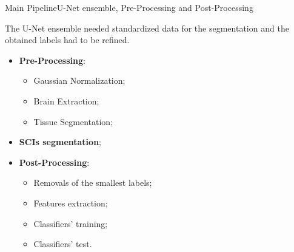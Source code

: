 \documentclass[]{standalone}
\begin{document}
	\begin{frame}{Main Pipeline}{U-Net ensemble, Pre-Processing and Post-Processing}
	\vspace{-20pt}

		
	The U-Net ensemble needed standardized data for the segmentation and the obtained labels had to be refined.
	\begin{itemize}
		\item \textbf{Pre-Processing}:
			\begin{itemize}
				\footnotesize
			 	\item Gaussian Normalization;
			 	\item Brain Extraction;
			 	\item Tissue Segmentation;
		 	\end{itemize}
		 \item \textbf{SCIs segmentation};
		 \item \textbf{Post-Processing}:
		 	\begin{itemize}
		 		\footnotesize
			 	\item Removals of the smallest labels;
			 	\item Features extraction;
			 	\item Classifiers' training;
			 	\item Classifiers' test.
		 	\end{itemize}
	\end{itemize}
			
	\end{frame}
\end{document}
